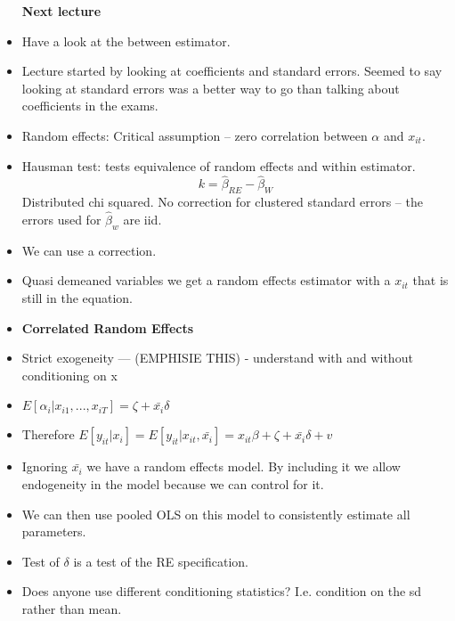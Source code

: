 \documentclass[12pt]{article}
\begin{document}
\begin{itemize}
            \textbf{Next lecture}
      \item Have a look at the between estimator.
      \item Lecture started by looking at coefficients and standard errors. Seemed to say looking at standard errors was a better way to go than talking about coefficients in the exams.
      \item Random effects: Critical assumption -- zero correlation between $\alpha$ and $x_{it}$.
      \item Hausman test: tests equivalence of random effects and within estimator.
            $$k = \hat{\beta}_{RE} - \hat{\beta}_{W}$$
            Distributed chi squared.
            No correction for clustered standard errors -- the errors used for $\hat{\beta}_{w}$ are iid.
      \item We can use a correction.
      \item Quasi demeaned variables we get a random effects estimator with a $x_{it}$ that is still in the equation.
      \item \textbf{Correlated Random Effects}
      \item Strict exogeneity --- (EMPHISIE THIS) - understand with and without conditioning on x
      \item $E[\alpha_{i}|x_{i1}, ..., x_{iT}] = \zeta + \bar{x_{i}} \delta$
      \item Therefore $E[y_{it}|x_{i}] = E[y_{it}|x_{it}, \bar{x_{i}}] = x_{it}\beta +  \zeta + \bar{x_{i}} \delta + v$
      \item Ignoring $\bar{x_{i}}$ we have a random effects model. By including it we allow endogeneity in the model because we can control for it.
      \item We can then use pooled OLS on this model to consistently estimate all parameters.
      \item Test of $\delta$ is a test of the RE specification.
      \item Does anyone use different conditioning statistics? I.e. condition on the sd rather than mean.
\end{itemize}
\end{document}
